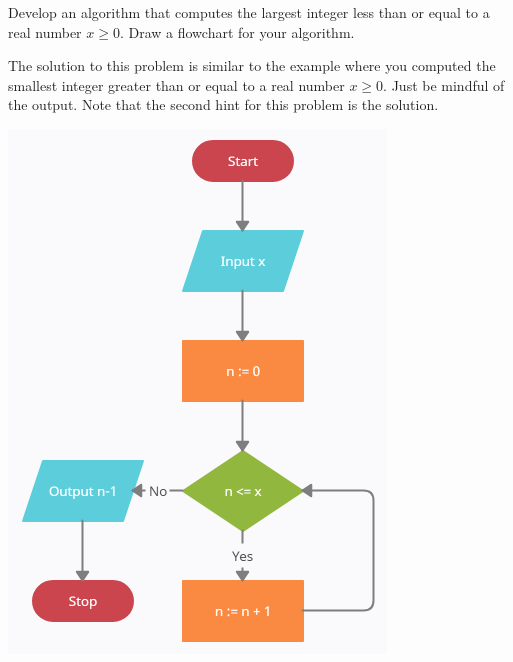 \documentclass{ximera}
\begin{document}
\begin{question}
	Develop an algorithm that computes the largest integer less than or equal to a real number $x\geq 0$. Draw a flowchart for your algorithm.
	\begin{hint}
		The solution to this problem is similar to the example where you computed the smallest integer greater than or equal to a real number $x\geq 0$. Just be mindful of the output. Note that the second hint for this problem is the solution.
	\end{hint}
	\begin{hint}
		\begin{center}
			\includegraphics{floorpos.png}
		\end{center}
	\end{hint}
\end{question}
\end{document}
